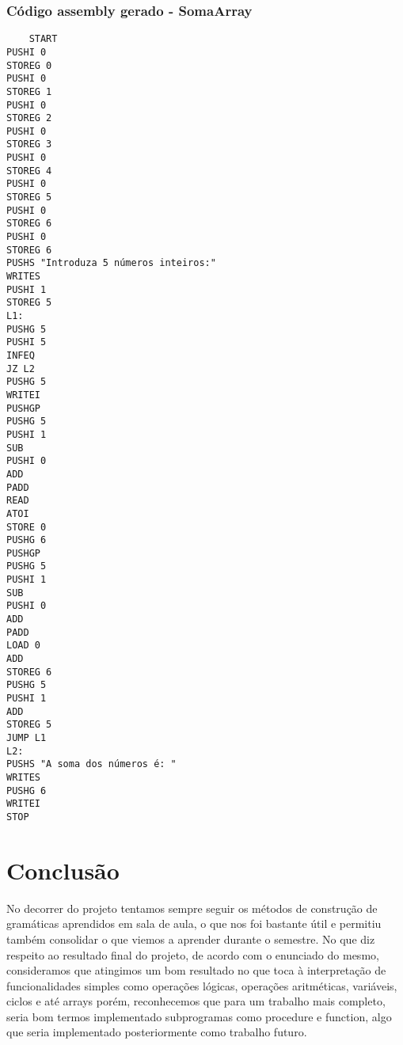 \documentclass[12pt,a4paper]{report}%
\begin{document}
\subsection{Código assembly gerado - SomaArray }
\begin{verbatim}
    START
PUSHI 0
STOREG 0
PUSHI 0
STOREG 1
PUSHI 0
STOREG 2
PUSHI 0
STOREG 3
PUSHI 0
STOREG 4
PUSHI 0
STOREG 5
PUSHI 0
STOREG 6
PUSHI 0
STOREG 6
PUSHS "Introduza 5 números inteiros:"
WRITES
PUSHI 1
STOREG 5
L1:
PUSHG 5
PUSHI 5
INFEQ
JZ L2
PUSHG 5
WRITEI
PUSHGP
PUSHG 5
PUSHI 1
SUB
PUSHI 0
ADD
PADD
READ
ATOI
STORE 0
PUSHG 6
PUSHGP
PUSHG 5
PUSHI 1
SUB
PUSHI 0
ADD
PADD
LOAD 0
ADD
STOREG 6
PUSHG 5
PUSHI 1
ADD
STOREG 5
JUMP L1
L2:
PUSHS "A soma dos números é: "
WRITES
PUSHG 6
WRITEI
STOP
\end{verbatim}




\chapter{Conclusão} \label{concl}
No decorrer do projeto tentamos sempre seguir os métodos de construção de gramáticas aprendidos em sala de aula, o que nos foi bastante útil e permitiu também consolidar o que viemos a aprender durante o semestre. No que diz respeito ao resultado final do projeto, de acordo com o enunciado do mesmo, consideramos que atingimos um bom resultado no que toca à interpretação de funcionalidades simples como operações lógicas, operações aritméticas, variáveis, ciclos e até arrays porém, reconhecemos que para um trabalho mais completo, seria bom termos implementado subprogramas como procedure e function, algo que seria implementado posteriormente como trabalho futuro.


\appendix %
\end{document}
